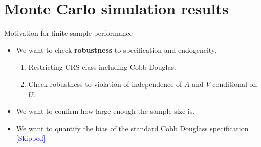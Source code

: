 \documentclass[aspectratio=169]{beamer}
\begin{document}
\section{Monte Carlo simulation results}

\begin{frame}{Motivation for finite sample performance}
\begin{itemize}
    \item We want to check \textbf{robustness} to specification and endogeneity.
    \begin{enumerate}
        \item Restricting CRS class including Cobb Douglas.
        \item Check robustness to violation of independence of $A$ and $V$ conditional on $U$.
    \end{enumerate}
    \item We want to confirm how large enough the sample size is.
    \item We want to quantify the bias of the standard Cobb Douglass specification \textcolor{blue}{[Skipped]}
\end{itemize}
    
\end{frame}
\end{document}
